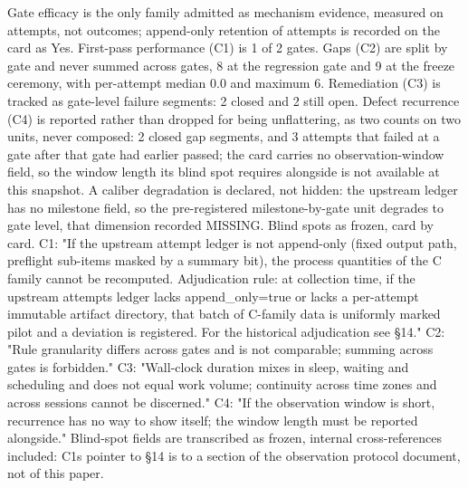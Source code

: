 \documentclass[
  english,
]{article}
\begin{document}
Gate efficacy is the only family admitted as mechanism evidence, measured on attempts, not outcomes; append-only retention of attempts is recorded on the card as Yes. First-pass performance (C1) is 1 of 2 gates. Gaps (C2) are split by gate and never summed across gates, 8 at the regression gate and 9 at the freeze ceremony, with per-attempt median 0.0 and maximum 6. Remediation (C3) is tracked as gate-level failure segments: 2 closed and 2 still open. Defect recurrence (C4) is reported rather than dropped for being unflattering, as two counts on two units, never composed: 2 closed gap segments, and 3 attempts that failed at a gate after that gate had earlier passed; the card carries no observation-window field, so the window length its blind spot requires alongside is not available at this snapshot. A caliber degradation is declared, not hidden: the upstream ledger has no milestone field, so the pre-registered milestone-by-gate unit degrades to gate level, that dimension recorded MISSING. Blind spots as frozen, card by card. C1: "If the upstream attempt ledger is not append-only (fixed output path, preflight sub-items masked by a summary bit), the process quantities of the C family cannot be recomputed. Adjudication rule: at collection time, if the upstream attempts ledger lacks append\_only=true or lacks a per-attempt immutable artifact directory, that batch of C-family data is uniformly marked pilot and a deviation is registered. For the historical adjudication see §14." C2: "Rule granularity differs across gates and is not comparable; summing across gates is forbidden." C3: "Wall-clock duration mixes in sleep, waiting and scheduling and does not equal work volume; continuity across time zones and across sessions cannot be discerned." C4: "If the observation window is short, recurrence has no way to show itself; the window length must be reported alongside." Blind-spot fields are transcribed as frozen, internal cross-references included: C1\textquotesingle s pointer to §14 is to a section of the observation protocol document, not of this paper.
\end{document}
